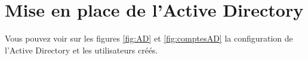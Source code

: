 \documentclass[a4paper]{article}
\begin{document}















\section{Mise en place de l'Active Directory}





Vous pouvez voir sur les figures \ref{fig:AD} et \ref{fig:comptesAD} la configuration de l'Active Directory et les utilisateurs créés.
\end{document}
